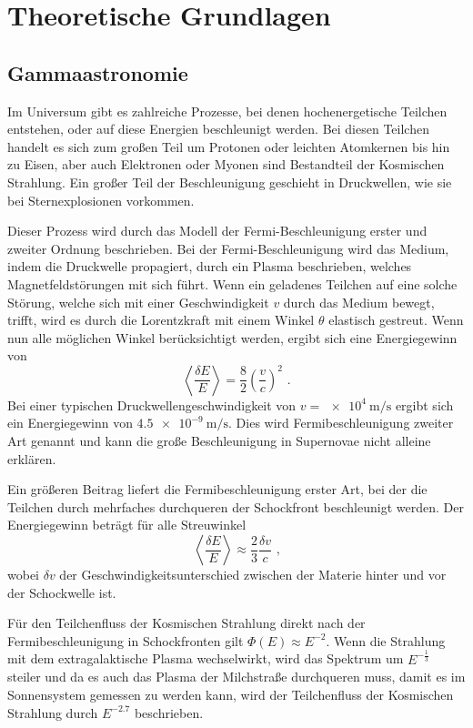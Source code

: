 \chapter{Theoretische Grundlagen}

\section{Gammaastronomie}
\label{sec:Gammaastronomie}

Im Universum gibt es zahlreiche Prozesse, bei denen hochenergetische Teilchen entstehen, oder auf diese Energien beschleunigt werden.
Bei diesen Teilchen handelt es sich zum großen Teil um Protonen oder leichten  Atomkernen bis hin zu Eisen, aber auch Elektronen oder Myonen
sind Bestandteil der Kosmischen Strahlung.
Ein großer Teil der Beschleunigung geschieht in Druckwellen, wie sie bei Sternexplosionen vorkommen.

Dieser Prozess wird durch das Modell der Fermi-Beschleunigung erster und zweiter Ordnung beschrieben.
Bei der Fermi-Beschleunigung wird das Medium, indem die Druckwelle propagiert, durch ein Plasma beschrieben, welches Magnetfeldstörungen mit sich führt.
Wenn ein geladenes Teilchen auf eine solche Störung, welche sich mit einer Geschwindigkeit $v$ durch das Medium bewegt, trifft, wird es durch die
Lorentzkraft mit einem Winkel $\theta$ elastisch gestreut.
Wenn nun alle möglichen Winkel berücksichtigt werden, ergibt sich eine Energiegewinn von
\begin{equation*}
  \left\langle \frac{\delta E}{E} \right\rangle = \frac{8}{2}\left(\frac{v}{c}\right)^2\text{ .}
\end{equation*}
Bei einer typischen Druckwellengeschwindigkeit von $v=\SI{e4}{\m\per\s}$\cite[14]{HESS} ergibt sich ein Energiegewinn von $\SI{4.5e-9}{\m\per\s}$.
Dies wird Fermibeschleunigung zweiter Art genannt und kann die große Beschleunigung in Supernovae nicht alleine erklären.

Ein größeren Beitrag liefert die Fermibeschleunigung erster Art, bei der die Teilchen durch mehrfaches durchqueren der Schockfront beschleunigt werden.
Der Energiegewinn beträgt für alle Streuwinkel
\begin{equation*}
  \left\langle \frac{\delta E}{E} \right\rangle \approx \frac{2}{3}\frac{\delta v}{c} \text{ ,}
\end{equation*}
wobei $\delta v$ der Geschwindigkeitsunterschied zwischen der Materie hinter und vor der Schockwelle ist.

Für den Teilchenfluss der Kosmischen Strahlung direkt nach der Fermibeschleunigung in Schockfronten gilt
$\Phi(E)\approx E^{-2}$.
Wenn die Strahlung mit dem extragalaktische Plasma wechselwirkt, wird das Spektrum um $E^{-\frac{1}{3}}$ steiler und
da es auch das Plasma der Milchstraße durchqueren muss, damit es im Sonnensystem gemessen zu werden kann, wird
der Teilchenfluss der Kosmischen Strahlung durch $E^{-2.7}$\cite[5]{Cosmic_rays} beschrieben.


